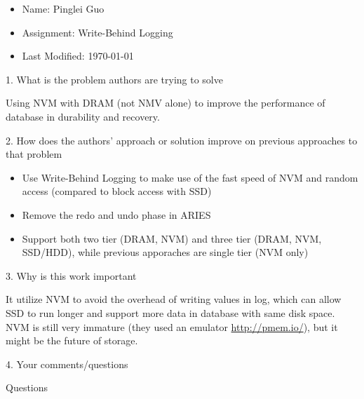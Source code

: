 \documentclass[12pt,a4paper,oneside]{article}
\begin{document}
\begin{itemize}
  \item Name: Pinglei Guo
  \item Assignment: Write-Behind Logging
  \item Last Modified: \today
\end{itemize}

1. What is the problem authors are trying to solve

\medskip

Using NVM with DRAM (not NMV alone) to improve the performance of database in
durability and recovery.

\bigskip

2. How does the authors’ approach or solution improve on previous approaches to that problem

\medskip

\begin{itemize}
  \item Use Write-Behind Logging to make use of the fast speed of NVM and random access (compared to block access with SSD)
  \item Remove the redo and undo phase in ARIES
  \item Support both two tier (DRAM, NVM) and three tier (DRAM, NVM, SSD/HDD), while previous apporaches are single tier (NVM only)
\end{itemize}

\bigskip

3. Why is this work important

\medskip

It utilize NVM to avoid the overhead of writing values in log, which can allow SSD to run longer
and support more data in database with same disk space.
NVM is still very immature (they used an emulator \url{http://pmem.io/}), but it might be the future of storage.

\bigskip

4. Your comments/questions

\medskip

Questions
\end{document}
